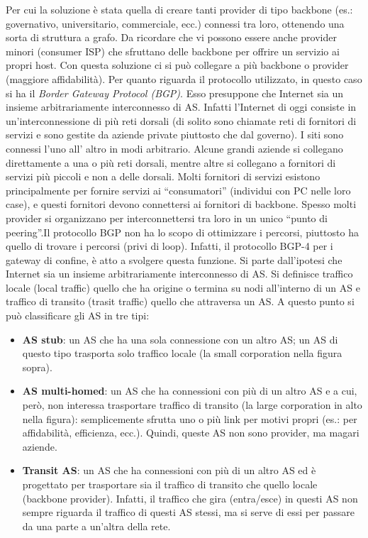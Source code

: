 Per cui la soluzione è stata quella di creare tanti provider di tipo backbone (es.: governativo, universitario, commerciale, ecc.) connessi tra loro, ottenendo una sorta di struttura a grafo. Da ricordare che vi possono essere anche provider minori (consumer ISP) che sfruttano delle backbone per offrire un servizio ai propri host. Con questa soluzione ci si può collegare a più backbone o provider (maggiore affidabilità). Per quanto riguarda il protocollo utilizzato, in questo caso si ha il \textit{Border Gateway Protocol (BGP)}. Esso presuppone che Internet sia un insieme arbitrariamente interconnesso di AS. Infatti l’Internet di oggi consiste in un’interconnessione di più reti dorsali (di solito sono chiamate reti di fornitori di servizi e sono gestite da aziende private piuttosto che dal governo). I siti sono connessi l’uno all’ altro in modi arbitrario. Alcune grandi aziende si collegano direttamente a una o più reti dorsali, mentre altre si collegano a fornitori di servizi più piccoli e non a delle dorsali. Molti fornitori di servizi esistono principalmente per fornire servizi ai “consumatori” (individui con PC nelle loro case), e questi fornitori devono connettersi ai fornitori di backbone. Spesso molti provider si organizzano per interconnettersi tra loro in un unico “punto di peering”.Il protocollo BGP non ha lo scopo di ottimizzare i percorsi, piuttosto ha quello di trovare i percorsi (privi di loop). Infatti, il protocollo BGP-4 per i gateway di confine, è atto a svolgere questa funzione. Si parte dall’ipotesi che Internet sia un insieme arbitrariamente interconnesso di AS. Si definisce traffico locale (local traffic) quello che ha origine o termina su nodi all’interno di un AS e traffico di transito (trasit traffic) quello che attraversa un AS. A questo punto si può classificare gli AS in tre tipi:
\begin{itemize}
  \item \textbf{AS stub}: un AS che ha una sola connessione con un altro AS; un AS di questo tipo trasporta solo traffico locale (la small corporation nella figura sopra).
  \item \textbf{AS multi-homed}: un AS che ha connessioni con più di un altro AS e a cui, però, non interessa trasportare traffico di transito (la large corporation in alto nella figura): semplicemente sfrutta uno o più link per motivi propri (es.: per affidabilità, efficienza, ecc.). Quindi, queste AS non sono provider, ma magari aziende.
  \item \textbf{Transit AS}: un AS che ha connessioni con più di un altro AS ed è progettato per trasportare sia il traffico di transito che quello locale (backbone provider). Infatti, il traffico che gira (entra/esce) in questi AS non sempre riguarda il traffico di questi AS stessi, ma si serve di essi per passare da una parte a un’altra della rete.
\end{itemize}

